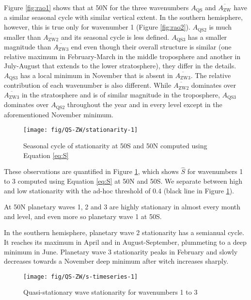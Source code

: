 \documentclass[draft,linenumbers]{agujournal2018}
\begin{document}
Figure \ref{fig:rao1} shows that at 50\degree N for the three
wavenumbers \(A_\mathrm{QS}\) and \(\overline{A_\mathrm{ZW}}\) have a
similar seasonal cycle with similar vertical extent. In the southern
hemisphere, however, this is true only for wavenumber 1 (Figure
\ref{fig:rao2}). \(A_\mathrm{QS2}\) is much smaller than
\(\overline{A_\mathrm{ZW2}}\) and its seasonal cycle is less defined.
\(A_\mathrm{QS3}\) has a smaller magnitude than
\(\overline{A_\mathrm{ZW3}}\) end even though their overall structure is
similar (one relative maximum in February-March in the middle
troposphere and another in July-August that extends to the lower
stratosphere), they differ in the details. \(A_\mathrm{QS3}\) has a
local minimum in November that is absent in
\(\overline{A_\mathrm{ZW3}}\). The relative contribution of each
wavenumber is also different. While \(\overline{A_\mathrm{ZW2}}\)
dominates over \(\overline{A_\mathrm{ZW3}}\) in the stratosphere and is
of similar magnitude in the troposphere, \(A_\mathrm{QS3}\) dominates
over \(A_\mathrm{QS2}\) throughout the year and in every level except in
the aforementioned November minimum.

\begin{figure}[h]

{\centering \texttt{[image: fig/QS-ZW/stationarity-1]} 

}

\caption{Seasonal cycle of stationarity at 50\degree S and 50\degree N computed using Equation \ref{eq:S}}\label{fig:stationarity}
\end{figure}

These observations are quantified in Figure \ref{fig:stationarity},
which shows \(\hat{S}\) for wavenumbers 1 to 3 computed using Equation
\ref{eq:S} at 50\degree N and 50\degree S. We separate between high and
low stationarity with the ad-hoc threshold of 0.4 (black line in Figure
\ref{fig:stationarity}).

At 50\degree N planetary waves 1, 2 and 3 are highly stationary in
almost every month and level, and even more so planetary wave 1 at
50\degree S.

In the southern hemisphere, planetary wave 2 stationarity has a
semianual cycle. It reaches its maximum in April and in
August-September, plummeting to a deep minimum in June. Planetary wave 3
stationarity peaks in February and slowly decreases towards a November
deep minimum after witch increases sharply.

\begin{figure}[h]

{\centering \texttt{[image: fig/QS-ZW/s-timeseries-1]} 

}

\caption{Quasi-stationary wave stationarity for wavenumbers 1 to 3}\label{fig:s-timeseries}
\end{figure}
\end{document}
